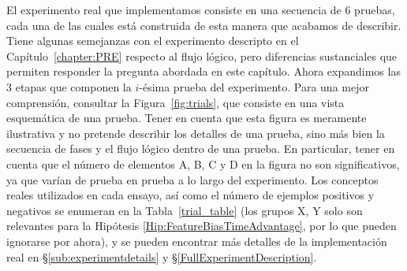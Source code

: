El experimento real que implementamos consiste en una secuencia de 6 pruebas, cada una de las cuales está construida de esta manera que acabamos de describir. Tiene algunas semejanzas con el experimento descripto en el Capítulo~\ref{chapter:PRE} respecto al flujo lógico, pero  diferencias sustanciales que permiten responder la pregunta abordada en este capítulo. Ahora expandimos las 3 etapas que componen la $i$-ésima prueba del experimento. Para una mejor comprensión, consultar la Figura~\ref{fig:trials}, que consiste en una vista esquemática de una prueba. Tener en cuenta que esta figura es meramente ilustrativa y no pretende describir los detalles de una prueba, sino más bien la secuencia de fases y el flujo lógico dentro de una prueba. En particular, tener en cuenta que el número de elementos {\sf A}, {\sf B}, {\sf C} y {\sf D} en la figura no son significativos, ya que varían de prueba en prueba a lo largo del experimento. Los conceptos reales utilizados en cada ensayo, así como el número de ejemplos positivos y negativos se enumeran en la Tabla~\ref{trial_table} (los grupos X, Y solo son relevantes para la Hipótesis \ref{Hip:FeatureBiasTimeAdvantage}, por lo que pueden ignorarse por ahora), y se pueden encontrar más detalles de la implementación real en \S\ref{sub:experimentdetails} y \S\ref{FullExperimentDescription}.  
%
